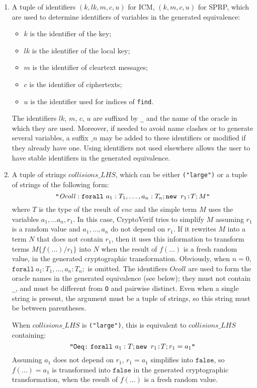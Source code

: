 \begin{itemize}
\begin{enumerate}
\item A tuple of identifiers $(k, lk, m, c, u)$ for ICM,
$(k, m, c, u)$ for SPRP, which are used to
determine identifiers of variables in the generated equivalence:
\begin{itemize}
\item $k$ is the identifier of the key;
\item $lk$ is the identifier of the local key;
\item $m$ is the identifier of cleartext messages;
\item $c$ is the identifier of ciphertexts;
\item $u$ is the identifier used for indices of {\tt find}.
\end{itemize}
The identifiers $lk$, $m$, $c$, $u$ are suffixed by \texttt{\_} and the
name of the oracle in which they are used. 
Moreover, if needed to avoid name clashes or to generate several variables,
a suffix $\_n$ may be added to these identifiers or modified if they
already have one. Using identifiers not used elsewhere allows
the user to have stable identifiers in the generated equivalence.

\item A tuple of strings $\mathit{collisions\_LHS}$, which can be either \texttt{("large")} or a tuple of strings of the following form:
\[\texttt{"}\mathit{Ocoll}: \texttt{forall}\ a_1:T_1, \dots, a_n:T_n; \texttt{new\ }{r_1}\texttt{:}{T}; M\texttt{"}\]
    where $T$ is the type of the result of $\mathit{enc}$ and the simple term $M$ uses the variables $a_1, \dots a_n, r_1$. In this case, CryptoVerif tries
    to simplify $M$ assuming $r_1$ is a random value and $a_1, \dots, a_n$ do not depend on $r_1$. If it
    rewrites $M$ into a term $N$ that does not contain $r_1$, then it uses this information to transform
    terms $M\{f(\dots)/r_1\}$ into $N$ when the result of $f(\dots)$ is a fresh random value, in the generated
    cryptographic transformation.
  Obviously, when $n = 0$, $\texttt{forall}\ a_1:T_1, \dots, a_n:T_n; $ is omitted.
  The identifiers $\mathit{Ocoll}$ are used to form the oracle names in the generated equivalence (see below); they must not contain \texttt{\_}, and must be different from \texttt{O} and pairwise distinct.
  Even when a single string is present, the argument must be a tuple of strings,
  so this string must be between parentheses.

  When $\mathit{collisions\_LHS}$ is \texttt{("large")}, this is equivalent to $\mathit{collisions\_LHS}$ containing:
  \[\texttt{"Oeq:}\ \texttt{forall}\ a_1:T; \Resa{r_1}{T}; r_1 = a_1\texttt{"}\]
  Assuming $a_1$ does not depend on $r_1$, $r_1 = a_1$ simplifies into
  $\texttt{false}$, so $f(\dots) = a_1$ is transformed into
  $\texttt{false}$ in the generated cryptographic transformation, when
  the result of $f(\dots)$ is a fresh random value.


\end{enumerate}
\end{itemize}

